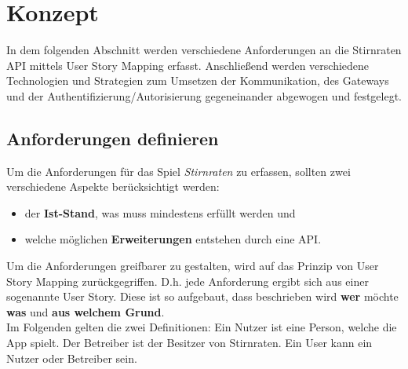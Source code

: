 \section{Konzept}
In dem folgenden Abschnitt werden verschiedene Anforderungen an die Stirnraten API mittels User Story Mapping erfasst. Anschließend werden verschiedene Technologien und Strategien zum Umsetzen der Kommunikation, des Gateways und der Authentifizierung/Autorisierung gegeneinander abgewogen und festgelegt.

\subsection{Anforderungen definieren}
Um die Anforderungen für das Spiel \textit{Stirnraten} zu erfassen, sollten zwei verschiedene Aspekte berücksichtigt werden: 

\begin{itemize}
	\item der \textbf{Ist-Stand}, was muss mindestens erfüllt werden und 
	\item welche möglichen \textbf{Erweiterungen} entstehen durch eine API.
\end{itemize}

Um die Anforderungen greifbarer zu gestalten, wird auf das Prinzip von User Story Mapping zurückgegriffen. D.h. jede Anforderung ergibt sich aus einer sogenannte User Story. Diese ist so aufgebaut, dass beschrieben wird \textbf{wer} möchte \textbf{was} und \textbf{aus welchem Grund}.\cite{UserStoryMapping}\\

Im Folgenden gelten die zwei Definitionen: Ein Nutzer ist eine Person, welche die App spielt. Der Betreiber ist der Besitzer von Stirnraten. Ein User kann ein Nutzer oder Betreiber sein. \\

